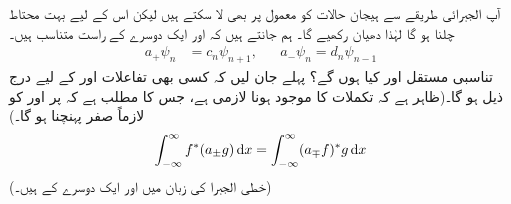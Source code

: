   آپ الجبرائی  طریقے سے ہیجان حالات کو معمول پر بھی لا سکتے ہیں لیکن اس کے لیے بہت محتاط چلنا ہو گا لہٰذا دھیان رکھیے  گا۔ ہم جانتے ہیں کہ 
 اور   ایک دوسرے کے راست متناسب ہیں۔ 
\begin{align} 
a_+ \psi_n&= c_n  \psi_{n+1}  , &&  a_- \psi_n = d_n \psi_{n-1}
\end{align} 
 تناسبی مستقل  اور   کیا ہوں گے؟  پہلے  جان لیں کہ کسی بھی تفاعلات  اور  کے لیے درج ذیل ہو گا۔(ظاہر ہے کہ تکملات کا موجود ہونا لازمی ہے، جس کا مطلب ہے کہ  پر  اور  کو لازماً صفر پہنچنا  ہو گا۔)
\begin{align}\label{مساوات_شروڈنگر_سیڑھی_متبادل}
\int_{ - \infty }^{ \infty } f^*( a_{\pm} g ) \dif x = \int_{ - \infty }^{ \infty } ( a_{\mp} f)^* g \dif x
\end{align}
(خطی الجبرا کی زبان میں  اور  ایک دوسرے کے   ہیں۔)


